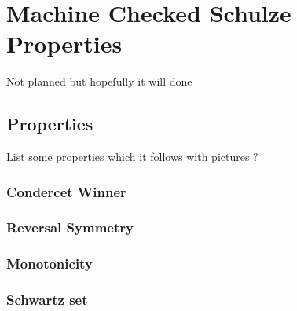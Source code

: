 \chapter{Machine Checked Schulze Properties}
\label{cha:machine_checked}
 Not planned but hopefully it will done
 \section{Properties}
	 List some properties which it follows with pictures ?
 	\subsection{Condercet Winner}
 	\subsection{Reversal Symmetry}
 	\subsection{Monotonicity}
 	\subsection{Schwartz set}